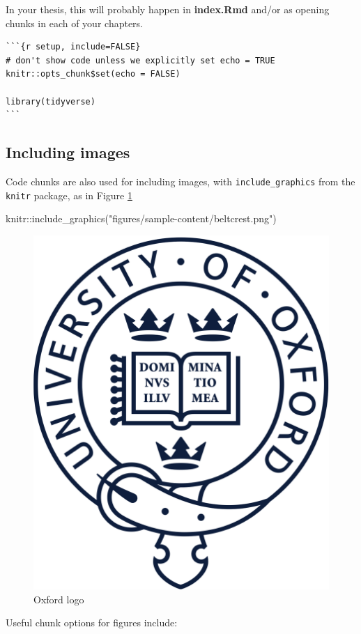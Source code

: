 \documentclass[a4paper, twoside]{templates/ociamthesis}
\newenvironment{Shaded}{\begin{snugshade}}{\end{snugshade}}
\newcommand{\FunctionTok}[1]{\textcolor[rgb]{0.00,0.00,0.00}{#1}}
\newcommand{\NormalTok}[1]{#1}
\newcommand{\SpecialCharTok}[1]{\textcolor[rgb]{0.00,0.00,0.00}{#1}}
\newcommand{\StringTok}[1]{\textcolor[rgb]{0.31,0.60,0.02}{#1}}
\renewenvironment{Shaded}
{
  \vspace{10pt}%
  \begin{snugshade}%
}{%
  \end{snugshade}%
  \vspace{8pt}%
}
\begin{document}
In your thesis, this will probably happen in \textbf{index.Rmd} and/or as opening chunks in each of your chapters.

\begin{verbatim}
```{r setup, include=FALSE}
# don't show code unless we explicitly set echo = TRUE
knitr::opts_chunk$set(echo = FALSE)

library(tidyverse)
```
\end{verbatim}

\hypertarget{including-images}{%
\subsection{Including images}\label{including-images}}

Code chunks are also used for including images, with \texttt{include\_graphics} from the \texttt{knitr} package, as in Figure \ref{fig:oxford-logo}

\begin{Shaded}
\begin{Highlighting}[]
\NormalTok{knitr}\SpecialCharTok{::}\FunctionTok{include\_graphics}\NormalTok{(}\StringTok{"figures/sample{-}content/beltcrest.png"}\NormalTok{)}
\end{Highlighting}
\end{Shaded}

\begin{figure}

{\centering \includegraphics[width=0.5\linewidth]{figures/sample-content/beltcrest} 

}

\caption{Oxford logo}\label{fig:oxford-logo}
\end{figure}

Useful chunk options for figures include:
\end{document}
